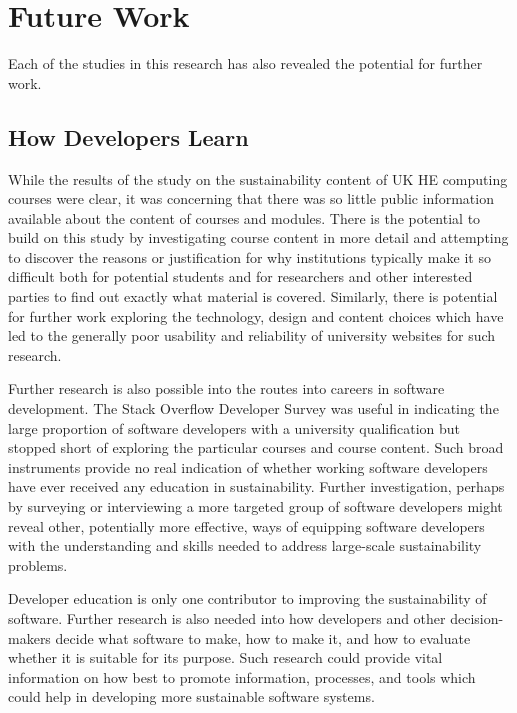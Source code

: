 \section{Future Work}
\label{section:future work}

Each of the studies in this research has also revealed the potential for further work.

\subsection{How Developers Learn}

While the results of the study on the sustainability content of UK HE computing courses were clear, it was concerning that there was so little public information available about the content of courses and modules. There is the potential to build on this study by investigating course content in more detail and attempting to discover the reasons or justification for why institutions typically make it so difficult both for potential students and for researchers and other interested parties to find out exactly what material is covered. Similarly, there is potential for further work exploring the technology, design and content choices which have led to the generally poor usability and reliability of university websites for such research.

Further research is also possible into the routes into careers in software development. The Stack Overflow Developer Survey \citep{StackOverflow2022} was useful in indicating the large proportion of software developers with a university qualification but stopped short of exploring the particular courses and course content. Such broad instruments provide no real indication of whether working software developers have ever received any education in sustainability. Further investigation, perhaps by surveying or interviewing a more targeted group of software developers might reveal other, potentially more effective, ways of equipping software developers with the understanding and skills needed to address large-scale sustainability problems.

Developer education is only one contributor to improving the sustainability of software. Further research is also needed into how developers and other decision-makers decide what software to make, how to make it, and how to evaluate whether it is suitable for its purpose. Such research could provide vital information on how best to promote information, processes, and tools which could help in developing more sustainable software systems.

